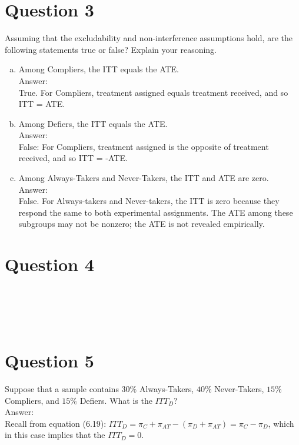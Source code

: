 \documentclass[11pt,notitlepage]{article}\usepackage[]{graphicx}\usepackage[]{color}
\makeatletter
\newenvironment{kframe}{%
 \def\at@end@of@kframe{}%
 \ifinner\ifhmode%
  \def\at@end@of@kframe{\end{minipage}}%
  \begin{minipage}{\columnwidth}%
 \fi\fi%
 \def\FrameCommand##1{\hskip\@totalleftmargin \hskip-\fboxsep
 \colorbox{shadecolor}{##1}\hskip-\fboxsep
     \hskip-\linewidth \hskip-\@totalleftmargin \hskip\columnwidth}%
 \MakeFramed {\advance\hsize-\width
   \@totalleftmargin\z@ \linewidth\hsize
   \@setminipage}}%
 {\par\unskip\endMakeFramed%
 \at@end@of@kframe}
\newenvironment{knitrout}{}{} %
\makeatother
\begin{document}
\section*{Question 3}
Assuming that the excludability and non-interference assumptions hold, are the following statements true or false? Explain your reasoning.
\begin{enumerate}[a)]
\item Among Compliers, the ITT equals the ATE. \\
Answer:\\
True. For Compliers, treatment assigned equals treatment received, and so ITT = ATE.
\item Among Defiers, the ITT equals the ATE.\\
Answer:\\
False:  For Compliers, treatment assigned is the opposite of treatment received, and so ITT = -ATE.
\item Among Always-Takers and Never-Takers, the ITT and ATE are zero.\\
Answer: \\
False. For Always-takers and Never-takers, the ITT is zero because they respond the same to both experimental assignments. The ATE among these subgroups may not be nonzero; the ATE is not revealed empirically.
\end{enumerate}

\section*{Question 4}
\begin{knitrout}
\color{fgcolor}\begin{kframe}
\begin{verbatim}





\end{verbatim}
\end{kframe}
\end{knitrout}


\section*{Question 5}
Suppose that a sample contains $30\%$ Always-Takers, $40\%$ Never-Takers, $15\%$ Compliers, and $15\%$ Defiers. What is the $ITT_D$? \\
Answer:\\
Recall from equation (6.19): $ITT_D= \pi_C+ \pi_{AT}- (\pi_D + \pi_{AT}) = \pi_C- \pi_D$, which in this case implies that the $ITT_D = 0$.
\end{document}
